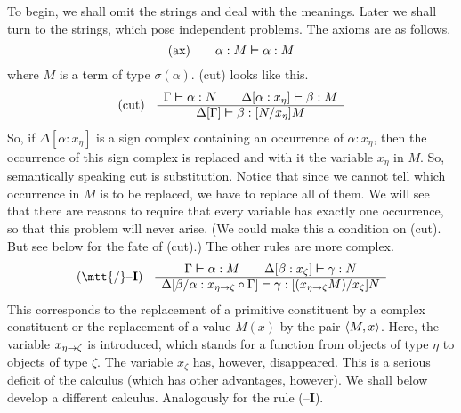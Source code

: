 To begin, we shall omit the strings and deal with the 
meanings. Later we shall turn to the strings, which pose 
independent problems. The axioms are as follows.
\begin{equation}
\mbox{\rm (ax)} \qquad 
\alpha  : M \boldsymbol{\vdash} \alpha : M
\end{equation}
where $M$ is a term of type $\sigma(\alpha)$. (cut) looks like this.
\begin{equation}
{\rm (cut)}\quad\begin{array}{c}
\Gamma \boldsymbol{\vdash} \alpha : N \qquad
    \Delta[\alpha : x_{\eta}]
    \boldsymbol{\vdash} \beta : M
\\\hline
\Delta[\Gamma] \boldsymbol{\vdash} \beta : [N/x_{\eta}]M
\end{array}
\end{equation}
So, if $\Delta[\alpha : x_{\eta}]$ is a sign complex containing 
an occurrence of $\alpha : x_{\eta}$, then the occurrence of this 
sign complex is replaced and with it the variable $x_{\eta}$ in 
$M$. So, semantically speaking cut is substitution. Notice that 
since we cannot tell which occurrence in $M$ is to be replaced, 
we have to replace all of them. We will see that there are reasons 
to require that every variable has exactly one occurrence, so that 
this problem will never arise. (We could make this a condition on (cut). 
But see below for the fate of (cut).) The other rules are more 
complex. 
\begin{equation}
\mbox{\rm ({\mtt{\tf}}--\textbf{I})}\quad
\begin{array}{c}
\Gamma \bvdash \alpha : M \qquad \Delta[\beta : x_{\zeta}] \bvdash \gamma :
    N \\\hline
\Delta[\beta/\alpha : x_{\eta \pf \zeta} \circ \Gamma] \bvdash \gamma :
    [(x_{\eta \pf \zeta}M)/x_{\zeta}]N
\end{array}
\end{equation}
This corresponds to the replacement of a primitive constituent by
a complex constituent or the replacement of a value $M(x)$ by the
pair $\langle M,x\rangle$. Here, the variable $x_{\eta \rightarrow \zeta}$ is
introduced, which stands for a function from objects of type 
$\eta$ to objects of type $\zeta$. The variable $x_{\zeta}$ has, 
however, disappeared. This is a serious deficit of the calculus 
(which has other advantages, however). We shall below develop a 
different calculus. Analogously for the rule ({\mtt{\tb}}--\textbf{I}). 
